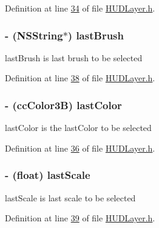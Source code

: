Definition at line \hyperlink{_h_u_d_layer_8h_source_l00034}{34} of file \hyperlink{_h_u_d_layer_8h_source}{H\-U\-D\-Layer.\-h}.

\hypertarget{interface_h_u_d_layer_ad7cb8a30419241ee8d2f2813031191be}{
\subsubsection[{last\-Brush}]{\setlength{\rightskip}{0pt plus 5cm}-\/ (N\-S\-String$\ast$) last\-Brush\hspace{0.3cm}{\ttfamily [protected]}}}\label{d3/d8a/interface_h_u_d_layer_ad7cb8a30419241ee8d2f2813031191be}
last\-Brush is last brush to be selected 

Definition at line \hyperlink{_h_u_d_layer_8h_source_l00038}{38} of file \hyperlink{_h_u_d_layer_8h_source}{H\-U\-D\-Layer.\-h}.

\hypertarget{interface_h_u_d_layer_a2d27bf64876ea6f0b2f0d1b9013c1cd7}{
\subsubsection[{last\-Color}]{\setlength{\rightskip}{0pt plus 5cm}-\/ (cc\-Color3\-B) last\-Color\hspace{0.3cm}{\ttfamily [protected]}}}\label{d3/d8a/interface_h_u_d_layer_a2d27bf64876ea6f0b2f0d1b9013c1cd7}
last\-Color is the last\-Color to be selected 

Definition at line \hyperlink{_h_u_d_layer_8h_source_l00036}{36} of file \hyperlink{_h_u_d_layer_8h_source}{H\-U\-D\-Layer.\-h}.

\hypertarget{interface_h_u_d_layer_aedd1d8d2b2d31e203c3242d09390b561}{
\subsubsection[{last\-Scale}]{\setlength{\rightskip}{0pt plus 5cm}-\/ (float) last\-Scale\hspace{0.3cm}{\ttfamily [protected]}}}\label{d3/d8a/interface_h_u_d_layer_aedd1d8d2b2d31e203c3242d09390b561}
last\-Scale is last scale to be selected 

Definition at line \hyperlink{_h_u_d_layer_8h_source_l00039}{39} of file \hyperlink{_h_u_d_layer_8h_source}{H\-U\-D\-Layer.\-h}.

